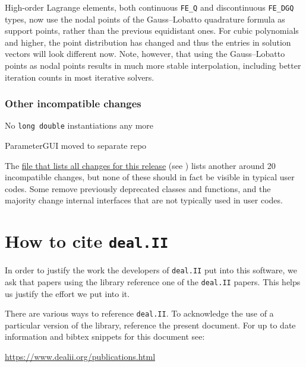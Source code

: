 \documentclass{ansarticle-preprint}
\newcommand{\specialword}[1]{\texttt{#1}}
\newcommand{\dealii}{{\specialword{deal.II}}}
\begin{document}
High-order Lagrange elements, both continuous \verb!FE_Q! and discontinuous
\verb!FE_DGQ! types, now use the nodal points of the Gauss--Lobatto
quadrature formula as support points, rather than the previous equidistant
ones. For cubic polynomials and higher, the point distribution has changed and
thus the entries in solution vectors will look different now. Note, however,
that using the Gauss--Lobatto points as nodal points results in much more
stable interpolation, including better iteration counts in most iterative
solvers.

\subsubsection{Other incompatible changes}

No \texttt{long double} instantiations any more

ParameterGUI moved to separate repo

The
\href{https://www.dealii.org/8.5.0/doxygen/deal.II/changes_between_8_4_and_8_5.html}{file
  that lists all changes for this release} (see \cite{changes85})
lists another around 20
incompatible changes, but none of these should in fact be visible in
typical user codes. Some remove previously deprecated classes and
functions, and the majority change internal interfaces that are not
typically used in user codes.



\section{How to cite \dealii{}}\label{sec:cite}

In order to justify the work the developers of \dealii{} put into this
software, we ask that papers using the library reference one of the
\dealii{} papers. This helps us justify the effort we put into it.

There are various ways to reference \dealii{}. To acknowledge the use of a
particular version of the library, reference the present document. For up
to date information and bibtex snippets for this document see:
\begin{center}
 \url{https://www.dealii.org/publications.html}
\end{center}

\end{document}
